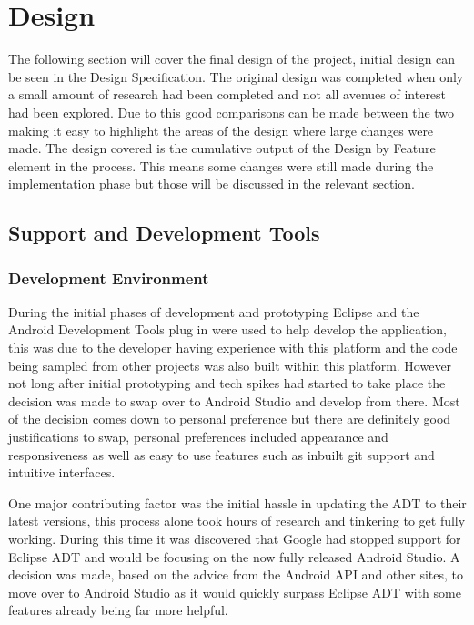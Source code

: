 \chapter{Design}
The following section will cover the final design of the project, initial design can be seen in the Design Specification. The original design was completed when only a small amount of research had been completed and not all avenues of interest had been explored. Due to this good comparisons can be made between the two making it easy to highlight the areas of the design where large changes were made. The design covered is the cumulative output of the Design by Feature element in the process. This means some changes were still made during the implementation phase but those will be discussed in the relevant section.
 \newpage
\section{Support and Development Tools}
\subsection{Development Environment}
During the initial phases of development and prototyping Eclipse and the Android Development Tools\cite{adt} plug in were used to help develop the application, this was due to the developer having experience with this platform and the code being sampled from other projects was also built within this platform. However not long after initial prototyping and tech spikes had started to take place the decision was made to swap over to Android Studio and develop from there. Most of the decision comes down to personal preference but there are definitely good justifications to swap, personal preferences included appearance and responsiveness as well as easy to use features such as inbuilt git support and intuitive interfaces. 

One major contributing factor was the initial hassle in updating the ADT to their latest versions, this process alone took hours of research and tinkering to get fully working. During this time it was discovered that Google had stopped support for Eclipse ADT and would be focusing on the now fully released Android Studio\cite{as}. A decision was made, based on the advice from the Android API and other sites, to move over to Android Studio as it would quickly surpass Eclipse ADT with some features already being far more helpful.

